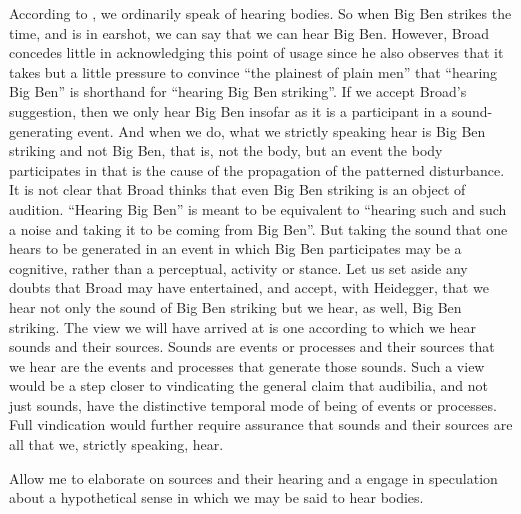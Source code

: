 According to \citet[4]{Broad:1952kx}, we ordinarily speak of hearing bodies. So when Big Ben strikes the time, and is in earshot, we can say that we can hear Big Ben. However, Broad concedes little in acknowledging this point of usage since he also observes that it takes but a little pressure to convince ``the plainest of plain men'' that ``hearing Big Ben'' is shorthand for ``hearing Big Ben striking''. If we accept Broad's suggestion, then we only hear Big Ben insofar as it is a participant in a sound-generating event. And when we do, what we strictly speaking hear is Big Ben striking and not Big Ben, that is, not the body, but an event the body participates in that is the cause of the propagation of the patterned disturbance. It is not clear that Broad thinks that even Big Ben striking is an object of audition. ``Hearing Big Ben'' is meant to be equivalent to ``hearing such and such a noise and taking it to be coming from Big Ben''. But taking the sound that one hears to be generated in an event in which Big Ben participates may be a cognitive, rather than a perceptual, activity or stance. Let us set aside any doubts that Broad may have entertained, and accept, with Heidegger, that we hear not only the sound of Big Ben striking but we hear, as well, Big Ben striking. The view we will have arrived at is one according to which we hear sounds and their sources. Sounds are events or processes and their sources that we hear are the events and processes that generate those sounds. Such a view would be a step closer to vindicating the general claim that audibilia, and not just sounds, have the distinctive temporal mode of being of events or processes. Full vindication would further require assurance that sounds and their sources are all that we, strictly speaking, hear.

Allow me to elaborate on sources and their hearing and a engage in speculation about a hypothetical sense in which we may be said to hear bodies.

